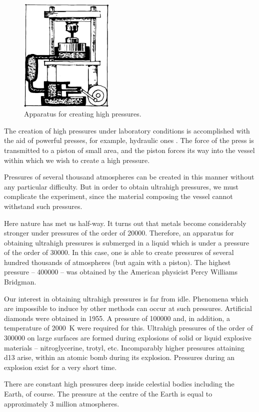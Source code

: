 \begin{figure}[!ht]
\centering
\includegraphics[width=0.4\textwidth]{figures/fig-7-9.pdf}
\caption{Apparatus for creating high pressures.}
\label{fig-7-9}
\end{figure}

The creation of high pressures under laboratory conditions is accomplished with the aid of powerful presses,
for example, hydraulic ones . The force of  the press is transmitted to a piston of small area, and
the piston forces its way into the vessel within which we wish to create a high pressure.

Pressures of several thousand atmospheres can be created in this manner without any particular difficulty. But in order to obtain ultrahigh pressures, we must complicate the experiment, since the material composing the vessel cannot withstand such pressures.

Here nature has met us half-way. It turns out that metals become considerably stronger under pressures of the order of \SI{20000}{\atmos}. Therefore, an apparatus for obtaining ultrahigh pressures is submerged in a liquid which is under a pressure of the order of \SI{30000}{\atmos}. In this case, one is able to create pressures of several hundred thousands of atmospheres (but again with
a piston). The highest pressure -- \SI{400000}{\atmos} -- was obtained by the American physicist Percy Williams Bridgman.

Our interest in obtaining ultrahigh pressures is far from idle. Phenomena which are impossible to induce by other methods can occur at such pressures. Artificial diamonds were obtained in 1955. A pressure of \SI{100000}{\atmos} and, in addition, a temperature of \SI{2000}{\kelvin} were required for this. Ultrahigh pressures of the order of \SI{300000}{\atmos} on large surfaces are formed during explosions of solid or liquid explosive materials -- nitroglycerine, trotyl, etc. Incomparably higher pressures attaining \SI{d13}{\atmos} arise, within an atomic bomb during its explosion. Pressures during an explosion exist for a very short time.

There are constant high pressures deep inside celestial bodies including the Earth, of course. The pressure at the centre of the Earth is equal to approximately 3 million atmospheres.
